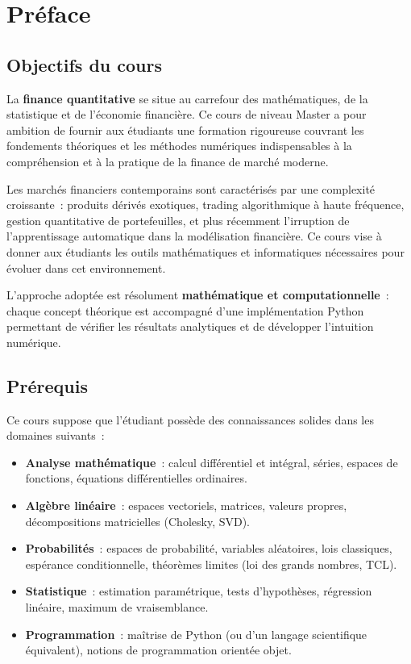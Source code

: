 \chapter*{Pr\'eface}

\section*{Objectifs du cours}

La \textbf{finance quantitative} se situe au carrefour des math\'ematiques,
de la statistique et de l'\'economie financi\`ere. Ce cours de niveau Master
a pour ambition de fournir aux \'etudiants une formation rigoureuse couvrant
les fondements th\'eoriques et les m\'ethodes num\'eriques indispensables \`a
la compr\'ehension et \`a la pratique de la finance de march\'e moderne.

Les march\'es financiers contemporains sont caract\'eris\'es par une complexit\'e
croissante~: produits d\'eriv\'es exotiques, trading algorithmique \`a haute
fr\'equence, gestion quantitative de portefeuilles, et plus r\'ecemment
l'irruption de l'apprentissage automatique dans la mod\'elisation financi\`ere.
Ce cours vise \`a donner aux \'etudiants les outils math\'ematiques et
informatiques n\'ecessaires pour \'evoluer dans cet environnement.

L'approche adopt\'ee est r\'esolument \textbf{math\'ematique et computationnelle}~:
chaque concept th\'eorique est accompagn\'e d'une impl\'ementation Python
permettant de v\'erifier les r\'esultats analytiques et de d\'evelopper
l'intuition num\'erique.

\section*{Pr\'erequis}

Ce cours suppose que l'\'etudiant poss\`ede des connaissances solides dans
les domaines suivants~:

\begin{itemize}
    \item \textbf{Analyse math\'ematique}~: calcul diff\'erentiel et int\'egral,
          s\'eries, espaces de fonctions, \'equations diff\'erentielles ordinaires.
    \item \textbf{Alg\`ebre lin\'eaire}~: espaces vectoriels, matrices,
          valeurs propres, d\'ecompositions matricielles (Cholesky, SVD).
    \item \textbf{Probabilit\'es}~: espaces de probabilit\'e, variables
          al\'eatoires, lois classiques, esp\'erance conditionnelle,
          th\'eor\`emes limites (loi des grands nombres, TCL).
    \item \textbf{Statistique}~: estimation param\'etrique, tests d'hypoth\`eses,
          r\'egression lin\'eaire, maximum de vraisemblance.
    \item \textbf{Programmation}~: ma\^itrise de Python (ou d'un langage
          scientifique \'equivalent), notions de programmation orient\'ee objet.
\end{itemize}

